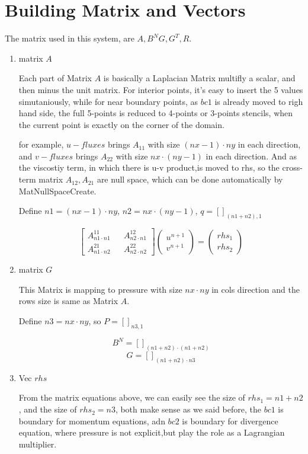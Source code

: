 \documentclass[11pt]{article}
\begin{document}
\section{Building Matrix and Vectors}

The matrix used in this system, are $A, B^NG, G^T, R$.

\begin{enumerate}

\item{ matrix $A$ }

Each part of Matrix $A$ is basically a Laplacian Matrix multifly a scalar, and then minus the unit matrix. For interior points, it's easy to insert the 5 values simutaniously, while for near boundary points, as $bc1$ is already moved to righ hand side, the full 5-points is reduced to 4-points or 3-points stencils, when the current point is exactly on the corner of the domain.

for example, $u-fluxes$ brings $A_{11}$ with size $ (nx-1) \cdot ny $ in each direction, and $v-fluxes$ brings $A_{22}$ with size $nx \cdot (ny-1)$ in each direction. And as the viscostiy term, in which there is u-v product,is moved to rhs, so the cross-term matrix $A_{12}, A_{21}$ are null space, which can be done automatically by MatNullSpaceCreate. 

Define $n1= (nx-1) \cdot ny $, $n2 = nx \cdot (ny-1) $, $q=[]_{(n1+n2),1}$

$$ 
\begin{bmatrix} A^{11}_{n1 \cdot n1} &&  A^{12}_{n2 \cdot n1}  \\ A^{21}_{n1 \cdot n2} && A^{22}_{n2 \cdot n2}  \end{bmatrix} \begin{pmatrix} u^{n+1} \\ v^{n+1} \end{pmatrix} = \left( \begin{array}{c} rhs_1 \\ rhs_2 \end{array} \right)$$


\item{matrix $G$ }

This Matrix is mapping to pressure with size $nx \cdot ny$ in cols direction and the rows size is same as Matrix $A$. 
 
Define $n3 = nx \cdot ny $, so $ P = []_{n3,1}$

$$ B^N = [  ]_{ (n1+n2) \cdot (n1+n2)} $$
$$ G = [ ]_{(n1+n2) \cdot n3} $$

\item{Vec $rhs$}

From the matrix equations above, we can easily see the size of $rhs_1 = n1 + n2$, and the size of $rhs_2 = n3$, both make sense as we said before, the $bc1$ is boundary for momentum equations, adn $bc2$ is boundary for divergence equation, where pressure is not explicit,but play the role as a Lagrangian multiplier. 

\end{enumerate}
\end{document}
